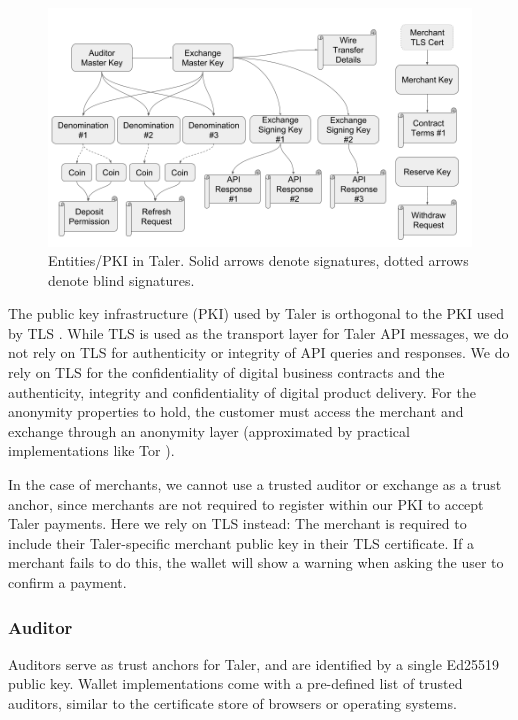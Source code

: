 \begin{figure}
    \includegraphics[width=\textwidth]{diagrams/taler-diagram-signatures.png}
    \caption[Entities/PKI in Taler]{Entities/PKI in Taler. Solid arrows denote signatures, dotted arrows denote blind signatures.}
\end{figure}

The public key infrastructure (PKI) used by Taler is orthogonal to the PKI used
by TLS \cite{rfc5246}.  While TLS is used as the transport layer for Taler API
messages, we do not rely on TLS for authenticity or integrity of API queries
and responses.  We do rely on TLS for the confidentiality of digital business
contracts and the authenticity, integrity and confidentiality of digital
product delivery.  For the anonymity properties to hold, the customer must
access the merchant and exchange through an anonymity layer (approximated
by practical implementations like Tor \cite{dingledine2004tor}).

In the case of merchants, we cannot use a trusted auditor or exchange as a
trust anchor, since merchants are not required to register within our PKI to
accept Taler payments.  Here we rely on TLS instead:  The merchant is required
to include their Taler-specific merchant public key in their TLS certificate.
If a merchant fails to do this, the wallet will show a warning when asking the
user to confirm a payment.

\subsubsection{Auditor}
Auditors serve as trust anchors for Taler, and are identified by a single Ed25519 public key.
Wallet implementations come with a pre-defined list of trusted auditors, similar to the certificate
store of browsers or operating systems.

